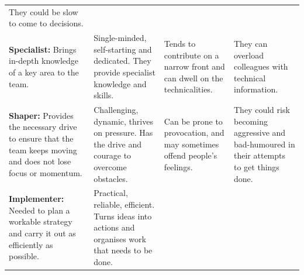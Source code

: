 \documentclass[]{book}
\begin{document}
\begin{longtable}[]{@{}llll@{}}
\begin{minipage}[t]{0.22\columnwidth}
They could be slow to come to decisions.\strut
\end{minipage}\tabularnewline
\begin{minipage}[t]{0.21\columnwidth}\raggedright
\textbf{Specialist:} Brings in-depth knowledge of a key area to the team.\strut
\end{minipage} & \begin{minipage}[t]{0.25\columnwidth}\raggedright
Single-minded, self-starting and dedicated. They provide specialist knowledge and skills.\strut
\end{minipage} & \begin{minipage}[t]{0.20\columnwidth}\raggedright
Tends to contribute on a narrow front and can dwell on the technicalities.\strut
\end{minipage} & \begin{minipage}[t]{0.22\columnwidth}\raggedright
They can overload colleagues with technical information.\strut
\end{minipage}\tabularnewline
\begin{minipage}[t]{0.21\columnwidth}\raggedright
\textbf{Shaper:} Provides the necessary drive to ensure that the team keeps moving and does not lose focus or momentum.\strut
\end{minipage} & \begin{minipage}[t]{0.25\columnwidth}\raggedright
Challenging, dynamic, thrives on pressure. Has the drive and courage to overcome obstacles.\strut
\end{minipage} & \begin{minipage}[t]{0.20\columnwidth}\raggedright
Can be prone to provocation, and may sometimes offend people's feelings.\strut
\end{minipage} & \begin{minipage}[t]{0.22\columnwidth}\raggedright
They could risk becoming aggressive and bad-humoured in their attempts to get things done.\strut
\end{minipage}\tabularnewline
\begin{minipage}[t]{0.21\columnwidth}\raggedright
\textbf{Implementer:} Needed to plan a workable strategy and carry it out as efficiently as possible.\strut
\end{minipage} & \begin{minipage}[t]{0.25\columnwidth}\raggedright
Practical, reliable, efficient. Turns ideas into actions and organises work that needs to be done.\strut
\end{minipage} & \begin{minipage}[t]{0.20\columnwidth}\raggedright

\end{minipage}
\end{longtable}
\end{document}
